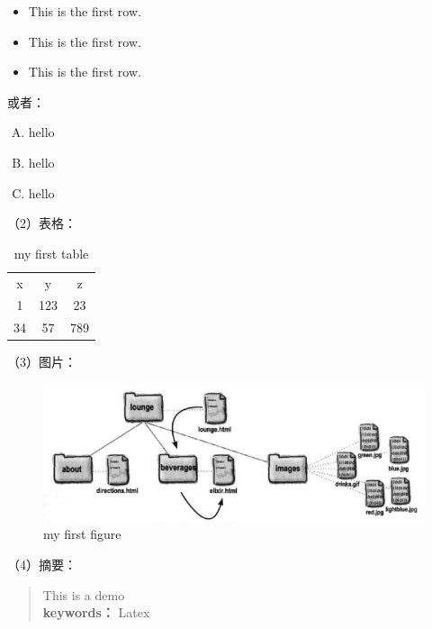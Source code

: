 \documentclass[a4paper]{article}
\begin{document}
\begin{itemize}
  \item This is the first row.
  \item This is the first row.
  \item This is the first row.
\end{itemize}

或者：

\begin{enumerate}[A.] %
  \item hello
  \item hello
  \item hello
\end{enumerate}

（2）表格：
\newpage  %
\begin{table}[h!]
    \centering
    \begin{tabular}{|c|c|c|} %
      \hline %
      x & y & z \\
      1 & 123 & 23 \\
      \cline{2-3} %
      34 & 57 & 789 \\
      \hline %
    \end{tabular}
    \caption{my first table}
\end{table}

（3）图片：

\begin{figure}[htb] %
  \centering
  \includegraphics[scale=0.3]{chapter2-1.jpeg}
  \caption{my first figure}
\end{figure}

（4）摘要：
\begin{abstract}
    This is a demo\\
  
    \textbf{keywords：} Latex
\end{abstract}
\end{document}
